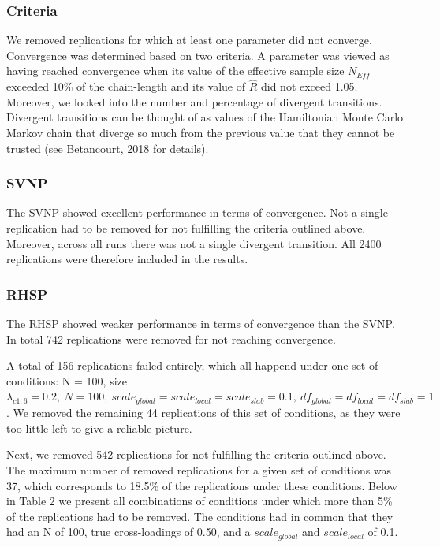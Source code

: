 \documentclass[
  man, donotrepeattitle,floatsintext]{apa6}
\begin{document}
\hypertarget{criteria}{%
\subsubsection{Criteria}\label{criteria}}

We removed replications for which at least one parameter did not converge. Convergence was determined based on two criteria. A parameter was viewed as having reached convergence when its value of the effective sample size \(N_{Eff}\) exceeded 10\% of the chain-length and its value of \(\hat{R}\) did not exceed 1.05.
Moreover, we looked into the number and percentage of divergent transitions. Divergent transitions can be thought of as values of the Hamiltonian Monte Carlo Markov chain that diverge so much from the previous value that they cannot be trusted (see Betancourt, 2018 for details).

\hypertarget{svnp}{%
\subsubsection{SVNP}\label{svnp}}

The SVNP showed excellent performance in terms of convergence. Not a single replication had to be removed for not fulfilling the criteria outlined above. Moreover, across all runs there was not a single divergent transition. All 2400 replications were therefore included in the results.

\hypertarget{rhsp}{%
\subsubsection{RHSP}\label{rhsp}}

The RHSP showed weaker performance in terms of convergence than the SVNP. In total 742 replications were removed for not reaching convergence.

A total of 156 replications failed entirely, which all happend under one set of conditions: N = 100, size \(\lambda_{c1,6} = 0.2, \  N = 100, \ scale_{global} = scale_{local} = scale_{slab} = 0.1, \ df_{global} = df_{local} = df_{slab} = 1\). We removed the remaining 44 replications of this set of conditions, as they were too little left to give a reliable picture.

Next, we removed 542 replications for not fulfilling the criteria outlined above. The maximum number of removed replications for a given set of conditions was 37, which corresponds to 18.5\% of the replications under these conditions. Below in Table 2 we present all combinations of conditions under which more than 5\% of the replications had to be removed. The conditions had in common that they had an N of 100, true cross-loadings of 0.50, and a \(scale_{global}\) and \(scale_{local}\) of 0.1.
\end{document}
